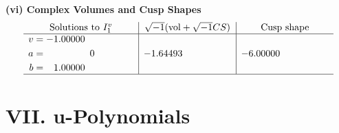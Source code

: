 \documentclass[1p]{elsarticle_modified}
\theoremstyle{definition}
\newcommand{\I}{\sqrt{-1}}
\begin{document}
\newpage\flushleft \textbf{(vi) Complex Volumes and Cusp Shapes}
$$\begin{array}{c|c|c}  
\text{Solutions to }I^v_{1}& \I (\text{vol} + \sqrt{-1}CS) & \text{Cusp shape}\\
 \hline 
\begin{aligned}
v &= -1.00000\phantom{ +0.000000I} \\
a &= \phantom{-0.000000 } 0 \\
b &= \phantom{-}1.00000\phantom{ +0.000000I}\end{aligned}
 & -1.64493\phantom{ +0.000000I} & -6.00000\phantom{ +0.000000I}\\
 \hline 
 \end{array}$$\newpage
\newpage\renewcommand{\arraystretch}{1}
\centering \section*{ VII. u-Polynomials}
\end{document}
